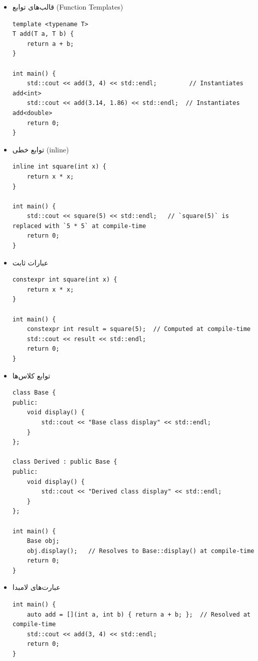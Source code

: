 \documentclass{article}
\begin{document}
\begin{itemize}
    \item قالب‌های توابع (Function Templates)
    \begin{LTR} %
	\begin{lstlisting}
template <typename T>
T add(T a, T b) {
    return a + b;
}

int main() {
    std::cout << add(3, 4) << std::endl;         // Instantiates add<int>
    std::cout << add(3.14, 1.86) << std::endl;  // Instantiates add<double>
    return 0;
}
	\end{lstlisting}
	\end{LTR}


    \item توابع خطی (inline)
    \begin{LTR} %
	\begin{lstlisting}
inline int square(int x) {
    return x * x;
}

int main() {
    std::cout << square(5) << std::endl;   // `square(5)` is replaced with `5 * 5` at compile-time
    return 0;
}
	\end{lstlisting}
	\end{LTR}


    \item عبارات ثابت
    \begin{LTR} %
	\begin{lstlisting}
constexpr int square(int x) {
    return x * x;
}

int main() {
    constexpr int result = square(5);  // Computed at compile-time
    std::cout << result << std::endl;
    return 0;
}
	\end{lstlisting}
	\end{LTR}



    \item توابع کلاس‌ها
    \begin{LTR} %
	\begin{lstlisting}
class Base {
public:
    void display() {
        std::cout << "Base class display" << std::endl;
    }
};

class Derived : public Base {
public:
    void display() {
        std::cout << "Derived class display" << std::endl;
    }
};

int main() {
    Base obj;
    obj.display();   // Resolves to Base::display() at compile-time
    return 0;
}
	\end{lstlisting}
	\end{LTR}

    \item عبارت‌های لامبدا
    \begin{LTR} %
	\begin{lstlisting}
int main() {
    auto add = [](int a, int b) { return a + b; };  // Resolved at compile-time
    std::cout << add(3, 4) << std::endl;
    return 0;
}
	\end{lstlisting}
	\end{LTR}

\end{itemize}
\end{document}
